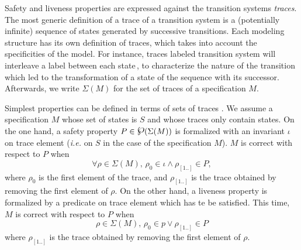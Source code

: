 \documentclass[oneside,a4paper]{memoir}
\newcommand{\powerset}{\raisebox{.15\baselineskip}{\Large\ensuremath{\wp}}}
\theoremstyle{break}
\begin{document}
Safety and liveness properties are expressed against the transition systems
\emph{traces}.
%
The most generic definition of a trace of a transition system is a (potentially
infinite) sequence of states generated by successive transitions.
%
Each modeling structure has its own definition of traces, which takes into
account the specificities of the model.
%
For instance, traces labeled transition system will interleave a label between
each state\,\cite{vijayaraghavan2015modular}, to characterize the nature of the
transition which led to the transformation of a state of the sequence with its
successor.
%
Afterwards, we write \( \Sigma(M) \) for the set of traces of a specification
\( M \).

Simplest properties can be defined in terms of sets of
traces\,\cite{schneider2000enforceable,basin2013enforceable}\,.
%
We assume a specification \( M \) whose set of states is \( S \) and whose
traces only contain states.
%
On the one hand, a safety property \( P \in \powerset(\Sigma(M)) \) is
formalized with an invariant \( \iota \) on trace element (\emph{i.e.} on
\( S \) in the case of the specification \( M \)). \( M \) is correct with
respect to \( P \) when
%
\[
  \forall \rho \in \Sigma(M)\text{, } \rho_0 \in \iota \wedge \rho_{[1..]} \in
  P,
\]
%
where \( \rho_0 \) is the first element of the trace, and \( \rho_{[1..]} \) is
the trace obtained by removing the first element of \( \rho \).
%
On the other hand, a liveness property is formalized by a predicate on trace
element which has te be satisfied. This time, \( M \) is correct with respect to
\( P \) when
%
\[
  \rho \in \Sigma(M)\text{, } \rho_0 \in p \vee \rho_{[1..]} \in P
\]
%
where \( \rho_{[1..]} \) is the trace obtained by removing the first element of
\( \rho \).
\end{document}
